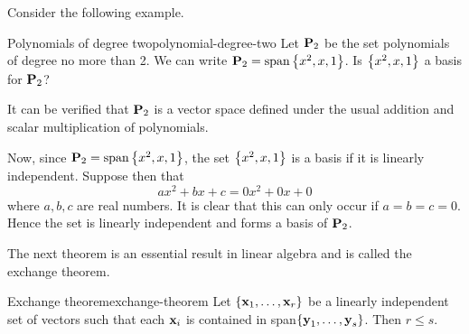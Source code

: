 Consider the following example.

\begin{example}{Polynomials of degree two}{polynomial-degree-two}
  Let $\mathbf{P}_2$ be the set polynomials of degree no more than 2. We
  can write $\Poly_2=\sspan\set{x^{2}, x, 1}$. Is $\left\{x^{2}, x, 1\right\} $
  a basis for $\mathbf{P}_2$?
\end{example}

\begin{solution}
  It can be verified that $\mathbf{P}_2$ is a vector space defined under
  the usual addition and scalar multiplication of polynomials.

  Now, since $\Poly_2=\sspan\set{x^{2},x, 1}$, the set
  $\left\{x^{2}, x, 1\right\} $ is a basis if it is linearly
  independent. Suppose then that
  \begin{equation*}
    ax^{2}+bx+c=0x^2 + 0x + 0
  \end{equation*}
  where $a,b,c$ are real numbers. It is clear that this can only occur
  if $a=b=c=0$. Hence the set is linearly independent and forms a
  basis of $\mathbf{P}_2$.
\end{solution}

The next theorem is an essential result in linear algebra and is
called the exchange theorem.

\begin{theorem}{Exchange theorem}{exchange-theorem}
  Let $\left\{\mbox{\bf x}_{1},\ldots,\mbox{\bf x}_{r}\right\} $ be a linearly
  independent set of vectors such that each $\mbox{\bf x}_{i}$ is
  contained in span$\left\{\mbox{\bf y}_{1},\ldots,\mbox{\bf y}_{s}\right\}$. Then
  $ r\leq s$.
\end{theorem}

